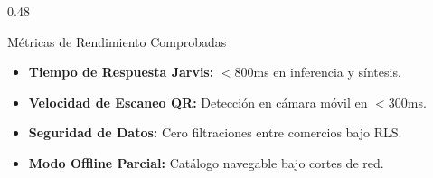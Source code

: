 \documentclass[aspectratio=169, 10pt]{beamer}
\begin{document}
\begin{frame}
\begin{columns}[T]
    \begin{column}{0.48\textwidth}
      \begin{exampleblock}{Métricas de Rendimiento Comprobadas}
        \scriptsize
        \begin{itemize}\setlength\itemsep{0.2em}
          \item \textbf{Tiempo de Respuesta Jarvis:} $<$800ms en inferencia y síntesis.
          \item \textbf{Velocidad de Escaneo QR:} Detección en cámara móvil en $<$300ms.
          \item \textbf{Seguridad de Datos:} Cero filtraciones entre comercios bajo RLS.
          \item \textbf{Modo Offline Parcial:} Catálogo navegable bajo cortes de red.
        \end{itemize}
      \end{exampleblock}
    \end{column}
  \end{columns}
\end{frame}
\end{document}
